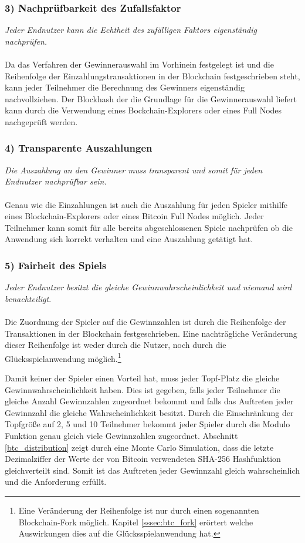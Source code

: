 \subsubsection{3) Nachprüfbarkeit des Zufallsfaktor}
\textit{Jeder Endnutzer kann die Echtheit des zufälligen Faktors eigenständig nachprüfen.}\\\\
Da das Verfahren der Gewinnerauswahl im Vorhinein festgelegt ist und die Reihenfolge der Einzahlungstransaktionen in der Blockchain festgeschrieben steht, kann jeder Teilnehmer die Berechnung des Gewinners eigenständig nachvollziehen. Der Blockhash der die Grundlage für die Gewinnerauswahl liefert kann durch die Verwendung eines Bockchain-Explorers oder eines Full Nodes nachgeprüft werden. 
\subsubsection{4) Transparente Auszahlungen}
\textit{Die Auszahlung an den Gewinner muss transparent und somit für jeden Endnutzer nachprüfbar sein.}\\\\
Genau wie die Einzahlungen ist auch die Auszahlung für jeden Spieler mithilfe eines Blockchain-Explorers oder eines Bitcoin Full Nodes möglich. Jeder Teilnehmer kann somit für alle bereits abgeschlossenen Spiele nachprüfen ob die Anwendung sich korrekt verhalten und eine Auszahlung getätigt hat. 
\subsubsection{5) Fairheit des Spiels}
\textit{Jeder Endnutzer besitzt die gleiche Gewinnwahrscheinlichkeit und niemand wird benachteiligt}.\\\\
Die Zuordnung der Spieler auf die Gewinnzahlen ist durch die Reihenfolge der Transaktionen in der Blockchain festgeschrieben. Eine nachträgliche Veränderung dieser Reihenfolge ist weder durch die Nutzer, noch durch die Glücksspielanwendung möglich.\footnote{Eine Veränderung der Reihenfolge ist nur durch einen sogenannten Blockchain-Fork möglich. Kapitel \ref{sssec:btc_fork} erörtert welche Auswirkungen dies auf die Glücksspielanwendung hat.}

Damit keiner der Spieler einen Vorteil hat, muss jeder Topf-Platz die gleiche Gewinnwahrscheinlichkeit haben.
Dies ist gegeben, falls jeder Teilnehmer die gleiche Anzahl Gewinnzahlen zugeordnet bekommt und falls das Auftreten jeder Gewinnzahl die gleiche Wahrscheinlichkeit besitzt. Durch die Einschränkung der Topfgröße auf 2, 5 und 10 Teilnehmer bekommt jeder Spieler durch die Modulo Funktion genau gleich viele Gewinnzahlen zugeordnet. Abschnitt \ref{btc_distribution} zeigt durch eine Monte Carlo Simulation, dass die letzte Dezimalziffer der Werte der von Bitcoin verwendeten SHA-256 Hashfunktion gleichverteilt sind. Somit ist das Auftreten jeder Gewinnzahl gleich wahrscheinlich und die Anforderung erfüllt.

